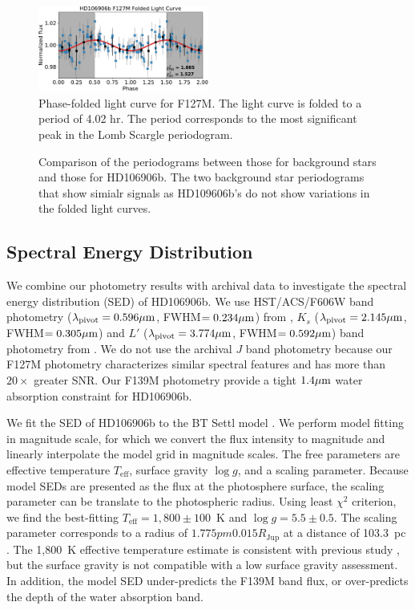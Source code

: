 \documentclass[twocolumn]{aastex62}
\begin{document}
\begin{figure}
  \centering
  \includegraphics[width=0.5\textwidth]{figures/F127M_foldedLC.pdf}
  \caption{Phase-folded light curve for F127M. The light curve is folded to a period of 4.02 hr. The period corresponds to the most significant peak in the Lomb Scargle periodogram.}
  \label{fig:fold}
\end{figure}

\begin{figure}
  \centering
  \caption{Comparison of the periodograms between those for background stars and those for HD106906b. The two background star periodograms that show simialr signals as HD109606b's do not show variations in the folded light curves.}
  \label{fig:all-periodograms}
\end{figure}


\subsection{Spectral Energy Distribution}
We combine our photometry results with archival data to investigate the spectral energy distribution (SED) of HD106906b.  We use HST/ACS/F606W band photometry ($\lambda_{\mathrm{pivot}}=0.596\mbox{$\mu$m}$, FWHM$=0.234\mbox{$\mu$m}$) from \citet{Kalas2015}, $K_{s}$ ($\lambda_{\mathrm{pivot}}=2.145\mbox{$\mu$m}$, FWHM$=0.305\mbox{$\mu$m}$) and $L'$ ($\lambda_{\mathrm{pivot}}=3.774\mbox{$\mu$m}$, FWHM$=0.592\mbox{$\mu$m}$) band photometry from \citet{Bailey2013}. We do not use the archival $J$ band photometry because our F127M photometry characterizes similar spectral features and has more than $20\times$ greater SNR. Our F139M photometry provide a tight $1.4\mbox{$\mu$m}$ water absorption constraint for HD106906b.

We fit the SED of HD106906b to the BT Settl model \citep[][Figure~\ref{fig:SED}]{Allard2012}. We perform model fitting in magnitude scale,  for which we convert the flux intensity to magnitude and linearly interpolate the model grid in magnitude scales. The free parameters are effective temperature $T_{\mathrm{eff}}$, surface gravity $\log g$, and a scaling parameter. Because model SEDs are presented as the flux at the photosphere surface, the scaling parameter can be translate to the photospheric radius. Using least $\chi^{2}$ criterion, we find the best-fitting $T_{\mathrm{eff}}=1,800\pm100$~K and $\log g=5.5\pm0.5$.  The scaling parameter corresponds to a radius of  $1.775pm0.015R_{\mathrm{Jup}}$ at a distance of 103.3~pc \citep{Gaia2018,Gaia2016}. The 1,800~K effective temperature estimate is consistent with previous study \citep{Bailey2013,Wu2016}, but the surface gravity is not compatible with a low surface gravity assessment. In addition, the model SED under-predicts the F139M band flux, or over-predicts the depth of the water absorption band.
\end{document}
